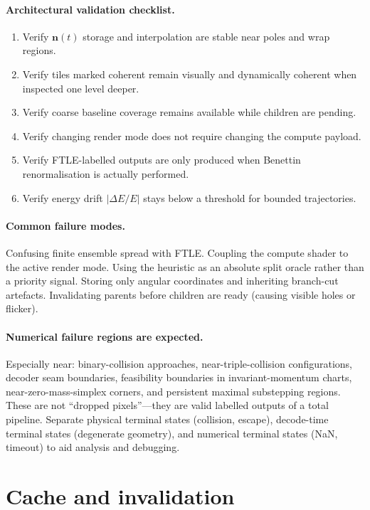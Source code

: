 \documentclass[11pt]{report}
\begin{document}
\paragraph{Architectural validation checklist.}
\begin{enumerate}[nosep]
\item Verify $\mathbf n(t)$ storage and interpolation are stable near poles and wrap regions.
\item Verify tiles marked coherent remain visually and dynamically coherent when inspected one level deeper.
\item Verify coarse baseline coverage remains available while children are pending.
\item Verify changing render mode does not require changing the compute payload.
\item Verify FTLE-labelled outputs are only produced when Benettin renormalisation is actually performed.
\item Verify energy drift $|\Delta E/E|$ stays below a threshold for bounded trajectories.
\end{enumerate}

\paragraph{Common failure modes.}
Confusing finite ensemble spread with FTLE. Coupling the compute shader to the active render mode. Using the heuristic as an absolute split oracle rather than a priority signal. Storing only angular coordinates and inheriting branch-cut artefacts. Invalidating parents before children are ready (causing visible holes or flicker).

\paragraph{Numerical failure regions are expected.} Especially near: binary-collision approaches, near-triple-collision configurations, decoder seam boundaries, feasibility boundaries in invariant-momentum charts, near-zero-mass-simplex corners, and persistent maximal substepping regions. These are not ``dropped pixels''---they are valid labelled outputs of a total pipeline. Separate physical terminal states (collision, escape), decode-time terminal states (degenerate geometry), and numerical terminal states (NaN, timeout) to aid analysis and debugging.

\section{Cache and invalidation}
\label{sec:cache}
\end{document}
